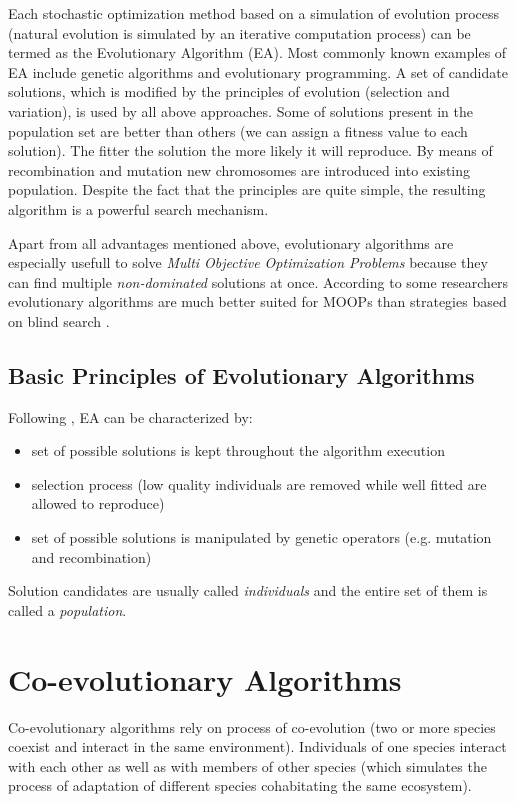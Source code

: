Each stochastic optimization method based on a simulation of evolution process (natural evolution is simulated by an iterative computation process)
can be termed as the Evolutionary Algorithm (EA).
Most commonly known examples of EA include genetic algorithms and evolutionary programming.
A set of candidate solutions, which is modified by the principles of evolution (selection and variation), is used by all above approaches.
Some of solutions present in the population set are better than others (we can assign a fitness value to each solution).
The fitter the solution the more likely it will reproduce.
By means of recombination and mutation new chromosomes are introduced into existing population.
Despite the fact that the principles are quite simple, the resulting algorithm is a powerful search mechanism.  

Apart from all advantages mentioned above, evolutionary algorithms are especially usefull to solve \emph{Multi Objective Optimization Problems} because they
can find multiple \emph{non-dominated} solutions at once. 
According to some researchers evolutionary algorithms are much better suited for MOOPs than strategies based on blind search \cite{Phd}.

\subsection{Basic Principles of Evolutionary Algorithms}

Following \cite{Phd}, EA can be characterized by:

\begin{itemize}
  \item set of possible solutions is kept throughout the algorithm execution
  \item selection process (low quality individuals are removed while well fitted are allowed to reproduce)
  \item set of possible solutions is manipulated by genetic operators (e.g. mutation and recombination)
\end{itemize}

Solution candidates are usually called \emph{individuals} and the entire set of them is called a \emph{population}. 
   
\section{Co-evolutionary Algorithms}
\label{sec:co-evol}

Co-evolutionary algorithms rely on process of co-evolution (two or more species coexist and interact in the same environment).
Individuals of one species interact with each other as well as with members of other species (which simulates the process of adaptation of different species cohabitating the same 
ecosystem).
  
